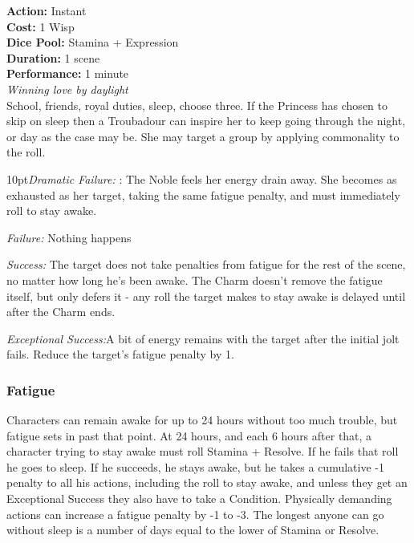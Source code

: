 \noindent \textbf{Action:} Instant  \\

\noindent \textbf{Cost:} 1 Wisp\\

\noindent \textbf{Dice Pool:} Stamina + Expression\\

\noindent \textbf{Duration:}  1 scene\\

\noindent \textbf{Performance:} 1 minute \\

\textit{Winning love by daylight} \\

\noindent School, friends, royal duties, sleep, choose three. If the Princess has chosen to skip on sleep then a Troubadour can inspire her to keep going through the night, or day as the case may be. She may target a group by applying commonality to the roll. 

\begin{myindentpar}{10pt}\emph{Dramatic Failure:} : The Noble feels her energy drain away. She becomes as exhausted as her target, taking the same fatigue penalty, and must immediately roll to stay awake.
 
 \emph{Failure:} Nothing happens
 
 \emph{Success:} The target does not take penalties from fatigue for the rest of the scene, no matter how long he’s been awake. The Charm doesn’t remove the fatigue itself, but only defers it - any roll the target makes to stay awake is delayed until after the Charm ends.
 
 \emph{Exceptional Success:}A bit of energy remains with the target after the initial jolt fails. Reduce the target’s fatigue penalty by 1.
 \end{myindentpar}
 
\begin{mybox}

\subsubsection*{Fatigue}

 Characters can remain awake for up to 24 hours without too much trouble, but fatigue sets in past that point. At 24 hours, and each 6 hours after that, a character trying to stay awake must roll Stamina + Resolve. If he fails that roll he goes to sleep. If he succeeds, he stays awake, but he takes a cumulative -1 penalty to all his actions, including the roll to stay awake, and unless they get an Exceptional Success they also have to take a Condition. Physically demanding actions can increase a fatigue penalty by -1 to -3. The longest anyone can go without sleep is a number of days equal to the lower of Stamina or Resolve. 
 \end{mybox}

